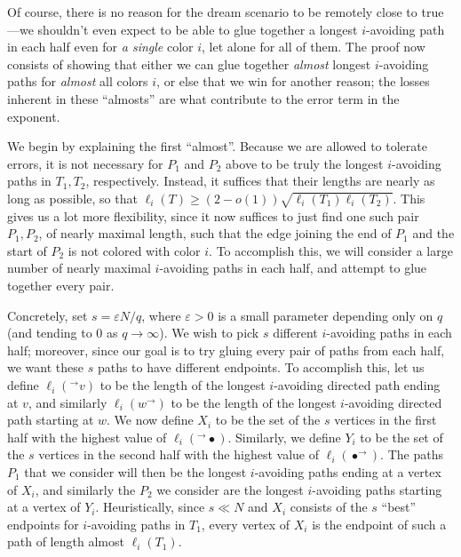 \documentclass[11pt,reqno]{amsart}
\theoremstyle{definition}
\newcommand\1{\mathbf{1}}
\let\geq\geqslant
\begin{document}
Of course, there is no reason for the dream scenario to be remotely close to true---we shouldn't even expect to be able to glue together a longest $i$-avoiding path in each half even for \emph{a single} color $i$, let alone for all of them. The proof now consists of showing that either we can glue together \emph{almost} longest $i$-avoiding paths for \emph{almost} all colors $i$, or else that we win for another reason; the losses inherent in these ``almosts'' are what contribute to the error term in the exponent. 

We begin by explaining the first ``almost''. Because we are allowed to tolerate errors, it is not necessary for $P_1$ and $P_2$ above to be truly the longest $i$-avoiding paths in $T_1,T_2$, respectively. Instead, it suffices that their lengths are nearly as long as possible, so that $\ell_i(T) \geq (2-o(1))\sqrt{\ell_i(T_1)\ell_i(T_2)}$. This gives us a lot more flexibility, since it now suffices to just find one such pair $P_1,P_2$, of nearly maximal length, such that the edge joining the end of $P_1$ and the start of $P_2$ is not colored with color $i$. To accomplish this, we will consider a large number of nearly maximal $i$-avoiding paths in each half, and attempt to glue together every pair.

Concretely, set $s = \varepsilon N/q$, where $\varepsilon>0$ is a small parameter depending only on $q$ (and tending to $0$ as $q \to \infty$). We wish to pick $s$ different $i$-avoiding paths in each half; moreover, since our goal is to try gluing every pair of paths from each half, we want these $s$ paths to have different endpoints. To accomplish this, let us define $\ell_i(^\to v)$ to be the length of the longest $i$-avoiding directed path ending at $v$, and similarly $\ell_i(w^\to)$ to be the length of the longest $i$-avoiding directed path starting at $w$. We now define $X_i$ to be the set of the $s$ vertices in the first half with the highest value of $\ell_i(^\to \bullet)$. Similarly, we define $Y_i$ to be the set of the $s$ vertices in the second half with the highest value of $\ell_i(\bullet^\to)$. The paths $P_1$ that we consider will then be the longest $i$-avoiding paths ending at a vertex of $X_i$, and similarly the $P_2$ we consider are the longest $i$-avoiding paths starting at a vertex of $Y_i$. Heuristically, since $s \ll N$ and $X_i$ consists of the $s$ ``best'' endpoints for $i$-avoiding paths in $T_1$, every vertex of $X_i$ is the endpoint of such a path of length almost $\ell_i(T_1)$.
\end{document}
